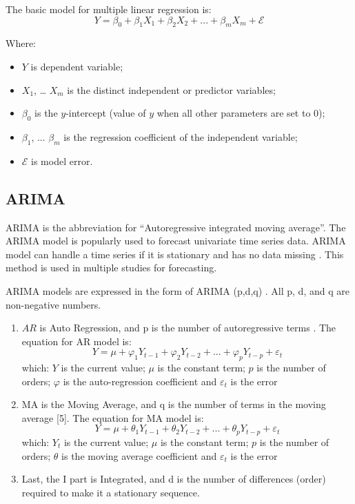 \documentclass{ieeeojies}
\begin{document}
The basic model for multiple linear regression is:
\begin{equation}
    Y = \beta_0 + \beta_1X_1 + \beta_2X_2 + ... + \beta_mX_m + \mathcal{E}
\end{equation}

Where:
\begin{itemize}
    \item $Y$ is dependent variable;
    \item $X_1$, … $X_m$ is the distinct independent or predictor variables;
    \item $\beta_0$ is the $y$-intercept (value of $y$ when all other parameters are set to 0);
    \item $\beta_1$, ... $\beta_m$ is the regression coefficient of the independent variable;
    \item $\mathcal{E}$ is model error.
\end{itemize}


\subsection{ARIMA}
ARIMA is the abbreviation for “Autoregressive integrated moving average”. The ARIMA model is popularly used to forecast univariate time series data. ARIMA model can handle a time series if it is stationary and has no data missing \cite{b6}. This method is used in multiple studies for forecasting.

ARIMA models are expressed in the form of ARIMA (p,d,q) \cite{b7}. All p, d, and q are non-negative numbers.

\begin{enumerate}
    \item$AR$ is Auto Regression, and p is the number of autoregressive terms \cite{b8}. The equation for AR model is:
          \begin{equation}
              Y = \mu + \varphi_1Y_{t-1} + \varphi_2Y_{t-2} + ... + \varphi_pY_{t-p} + \varepsilon_t
          \end{equation}
          which: $Y$ is the current value; $\mu$ is the constant term; $p$ is the number of orders; $\varphi$ is the auto-regression coefficient and $\varepsilon_t$ is the error
    \item MA is the Moving Average, and q is the number of terms in the moving average [5]. The equation for MA model is:
          \begin{equation}
              Y = \mu + \theta_1Y_{t-1} + \theta_2Y_{t-2} + ... + \theta_pY_{t-p} + \varepsilon_t
          \end{equation}
          which: $Y_t$ is the current value; $\mu$ is the constant term; $p$ is the number of orders; $\theta$ is the moving average coefficient and $\varepsilon_t$ is the error
    \item Last, the I part is Integrated, and d is the number of differences (order) required to make it a stationary sequence.
\end{enumerate}
\end{document}
